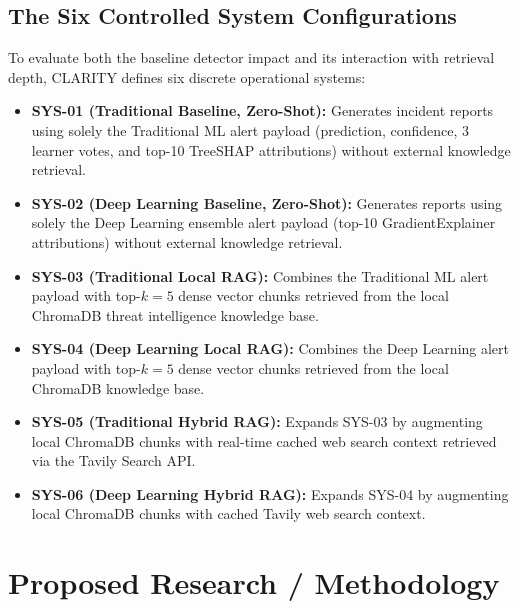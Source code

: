 \documentclass[conference]{IEEEtran}
\begin{document}
\subsection{The Six Controlled System Configurations}
To evaluate both the baseline detector impact and its interaction with retrieval depth, CLARITY defines six discrete operational systems:
\begin{itemize}
    \item \textbf{SYS-01 (Traditional Baseline, Zero-Shot):} Generates incident reports using solely the Traditional ML alert payload (prediction, confidence, 3 learner votes, and top-10 TreeSHAP attributions) without external knowledge retrieval.
    \item \textbf{SYS-02 (Deep Learning Baseline, Zero-Shot):} Generates reports using solely the Deep Learning ensemble alert payload (top-10 GradientExplainer attributions) without external knowledge retrieval.
    \item \textbf{SYS-03 (Traditional Local RAG):} Combines the Traditional ML alert payload with top-$k=5$ dense vector chunks retrieved from the local ChromaDB threat intelligence knowledge base.
    \item \textbf{SYS-04 (Deep Learning Local RAG):} Combines the Deep Learning alert payload with top-$k=5$ dense vector chunks retrieved from the local ChromaDB knowledge base.
    \item \textbf{SYS-05 (Traditional Hybrid RAG):} Expands SYS-03 by augmenting local ChromaDB chunks with real-time cached web search context retrieved via the Tavily Search API.
    \item \textbf{SYS-06 (Deep Learning Hybrid RAG):} Expands SYS-04 by augmenting local ChromaDB chunks with cached Tavily web search context.
\end{itemize}

\section{Proposed Research / Methodology}
\end{document}
